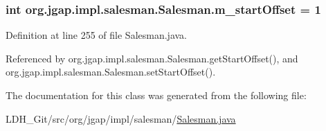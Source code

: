 \hypertarget{classorg_1_1jgap_1_1impl_1_1salesman_1_1_salesman_a2b3a133e0be2cd885c11ef899563f816}{
\subsubsection[{m\-\_\-start\-Offset}]{\setlength{\rightskip}{0pt plus 5cm}int org.\-jgap.\-impl.\-salesman.\-Salesman.\-m\-\_\-start\-Offset = 1\hspace{0.3cm}{\ttfamily [private]}}}\label{classorg_1_1jgap_1_1impl_1_1salesman_1_1_salesman_a2b3a133e0be2cd885c11ef899563f816}


Definition at line 255 of file Salesman.\-java.



Referenced by org.\-jgap.\-impl.\-salesman.\-Salesman.\-get\-Start\-Offset(), and org.\-jgap.\-impl.\-salesman.\-Salesman.\-set\-Start\-Offset().



The documentation for this class was generated from the following file\-:\begin{DoxyCompactItemize}
\item 
L\-D\-H\-\_\-\-Git/src/org/jgap/impl/salesman/\hyperlink{_salesman_8java}{Salesman.\-java}\end{DoxyCompactItemize}
